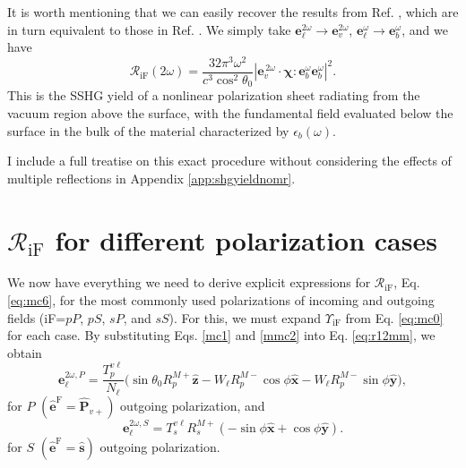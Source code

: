 It is worth mentioning that we can easily recover the results from Ref.
\cite{mizrahiJOSA88}, which are in turn equivalent to those in Ref.
\cite{sipePRB87}. We simply take
$\mathbf{e}^{2\omega}_{\ell}\to\mathbf{e}^{2\omega}_{v}$,
$\mathbf{e}^{\omega}_{\ell}\to\mathbf{e}^{\omega}_{b}$, and we have
\begin{equation}\label{eq:m69}
\mathcal{R}_{\mathrm{iF}}(2\omega) =
\frac{32\pi^{3}\omega^{2}}{c^{3}\cos^{2}\theta_{0}}
\left\vert\mathbf{e}^{\,2\omega}_{v}\cdot
\boldsymbol{\chi}:\mathbf{e}^{\omega}_{b}\mathbf{e}^{\omega}_{b}
\right\vert^{2}.
\end{equation}
This is the SSHG yield  of a nonlinear polarization sheet radiating from the
vacuum region above the surface, with the fundamental field evaluated below the
surface in the bulk of the material characterized by $\epsilon_{b}(\omega)$.

I include a full treatise on this exact procedure without considering the
effects of multiple reflections in Appendix \ref{app:shgyieldnomr}.



\section{\texorpdfstring{$\mathcal{R}_{\mathrm{iF}}$}{R} for different
polarization cases}\label{sec:rcases}

We now have everything we need to derive explicit expressions for
$\mathcal{R}_{\mathrm{iF}}$, Eq. \eqref{eq:mc6}, for the most commonly used
polarizations of incoming and outgoing fields (iF=$pP$, $pS$, $sP$, and $sS$).
For this, we must expand $\Upsilon_{\mathrm{iF}}$ from Eq. \eqref{eq:mc0} for each
case. By substituting Eqs. \eqref{mc1} and \eqref{mmc2} into Eq. \eqref{eq:r12mm},
we obtain
\begin{equation}\label{eq:e2wpmr}
\mathbf{e}^{2\omega,P}_{\ell} =
\frac{T^{v\ell}_{p}}{N_{\ell}}
\big(
  \sin\theta_{0}R^{M+}_{p}\hat{\mathbf{z}}
- W_{\ell}R^{M-}_{p}\cos\phi\hat{\mathbf{x}}
- W_{\ell}R^{M-}_{p}\sin\phi\hat{\mathbf{y}}
\big),
\end{equation}
for $P$ $(\hat{\mathbf{e}}^{\mathrm{F}} = \hat{\mathbf{P}}_{v+})$ outgoing
polarization, and
\begin{equation}\label{eq:e2wsmr}
\mathbf{e}^{2\omega,S}_{\ell} =
T_{s}^{v\ell}R^{M+}_{s}
\left(
- \sin\phi\hat{\mathbf{x}}
+ \cos\phi\hat{\mathbf{y}}
\right).
\end{equation}
for $S$ $(\hat{\mathbf{e}}^{\mathrm{F}}=\hat{\mathbf{s}})$ outgoing polarization.

